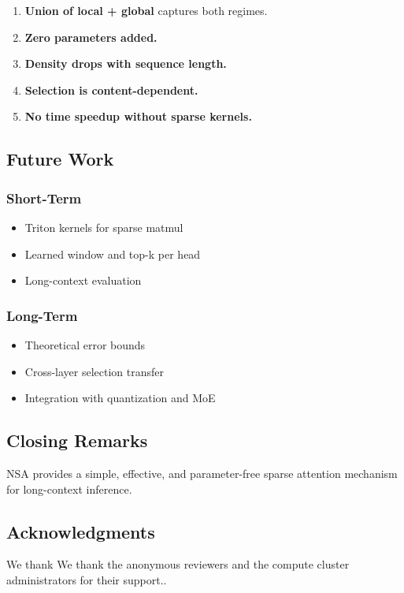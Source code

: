 \begin{enumerate}
\item \textbf{Union of local + global} captures both regimes.
\item \textbf{Zero parameters added.}
\item \textbf{Density drops with sequence length.}
\item \textbf{Selection is content-dependent.}
\item \textbf{No time speedup without sparse kernels.}

\end{enumerate}
\subsection{Future Work}

\subsubsection{Short-Term}
\begin{itemize}
\item Triton kernels for sparse matmul
\item Learned window and top-k per head
\item Long-context evaluation

\end{itemize}
\subsubsection{Long-Term}
\begin{itemize}
\item Theoretical error bounds
\item Cross-layer selection transfer
\item Integration with quantization and MoE

\end{itemize}
\subsection{Closing Remarks}

NSA provides a simple, effective, and parameter-free sparse attention 
mechanism for long-context inference.

\subsection{Acknowledgments}

We thank We thank the anonymous reviewers and the compute cluster administrators for their support..


